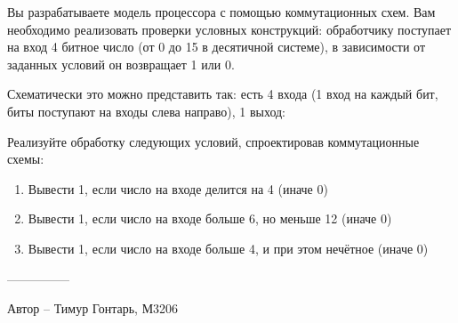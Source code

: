 \question
Вы разрабатываете модель процессора с помощью коммутационных схем. Вам необходимо реализовать проверки условных конструкций: обработчику поступает на вход 4 битное число (от 0 до 15 в десятичной системе), в зависимости от заданных условий он возвращает 1 или 0.

Схематически это можно представить так: есть 4 входа (1 вход на каждый бит, биты поступают на входы слева направо), 1 выход:
\\
\begin{figure}[h]

\begin{minipage}[h]{0.55\linewidth}
\end{minipage}
\begin{minipage}[h]{0.45\linewidth}
\end{minipage}
\end{figure}

Реализуйте обработку следующих условий, спроектировав коммутационные схемы:
\begin{enumerate}
    \item Вывести 1, если число на входе делится на 4 (иначе 0)
    \item Вывести 1, если число на входе больше 6, но меньше 12 (иначе 0)
    \item Вывести 1, если число на входе больше 4, и при этом нечётное (иначе 0)
\end{enumerate}

---------------

Автор -- Тимур Гонтарь, М3206